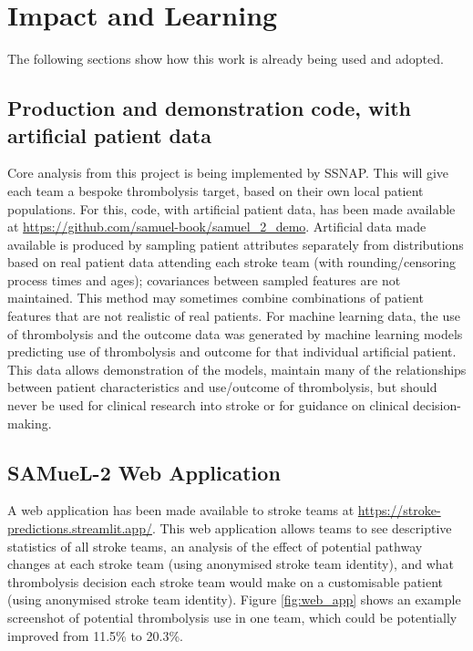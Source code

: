 \section{Impact and Learning}

The following sections show how this work is already being used and adopted.

\subsection{Production and demonstration code, with artificial patient data}

Core analysis from this project is being implemented by SSNAP. This will give each team a bespoke thrombolysis target, based on their own local patient populations. For this, code, with artificial patient data, has been made available at \url{https://github.com/samuel-book/samuel_2_demo}. Artificial data made available is produced by sampling patient attributes separately from distributions based on real patient data attending each stroke team (with rounding/censoring process times and ages); covariances between sampled features are not maintained. This method may sometimes combine combinations of patient features that are not realistic of real patients. For machine learning data, the use of thrombolysis and the outcome data was generated by machine learning models predicting use of thrombolysis and outcome for that individual artificial patient. This data allows demonstration of the models, maintain many of the relationships between patient characteristics and use/outcome of thrombolysis, but should never be used for clinical research into stroke or for guidance on clinical decision-making.

\subsection{SAMueL-2 Web Application}

A web application has been made available to stroke teams at \url{https://stroke-predictions.streamlit.app/}. This web application allows teams to see descriptive statistics of all stroke teams, an analysis of the effect of potential pathway changes at each stroke team (using anonymised stroke team identity), and what thrombolysis decision each stroke team would make on a customisable patient (using anonymised stroke team identity). Figure \ref{fig:web_app} shows an example screenshot of potential thrombolysis use in one team, which could be potentially improved from 11.5\% to 20.3\%.

